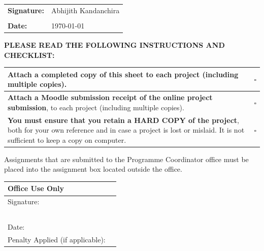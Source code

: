 \begin{table}[!h]
\begin{center}
\small
\begin{tabular}{||p{}|p{}||}
	\hline
	\textbf{Signature:} & Abhijith Kandanchira \\
	                    &        \\ \hline
	\textbf{Date:}      & \today \\ \hline
\end{tabular}
\end{center}
\end{table}

\vspace{-.5cm}
\noindent \textbf{PLEASE READ THE FOLLOWING INSTRUCTIONS AND CHECKLIST:}\\
\vspace{-.5cm}

\begin{table}[!h]
\begin{center}
\small
\begin{tabular}{||p{}|p{}||}
	\hline
	Attach a completed copy of this sheet to each project (including multiple copies).                                                                                                           & $\square$ \\ \hline
	\textbf{Attach a Moodle submission receipt of the online project submission}, to each project (including multiple copies).                                                                   & $\square$ \\ \hline
	\textbf{You must ensure that you retain a HARD COPY of the project}, both for your own reference and in case a project is lost or mislaid. It is not sufficient to keep a copy on computer. & $\square$ \\ \hline
\end{tabular}
\end{center}
\end{table}
\vspace{-.5cm}

Assignments that are submitted to the Programme Coordinator office must be placed into the assignment box located outside the office.

\begin{table}[!h]
\begin{center}
\small
\begin{tabular}{||p{}|p{}||}
	\hline
	\multicolumn{2}{||l||}{\textbf{Office Use Only}} \\ \hline
	Signature:                       &               \\
	~                                &               \\ \hline
	Date:                            &               \\ \hline
	Penalty Applied (if applicable): &               \\ \hline
\end{tabular}
\end{center}
\end{table}